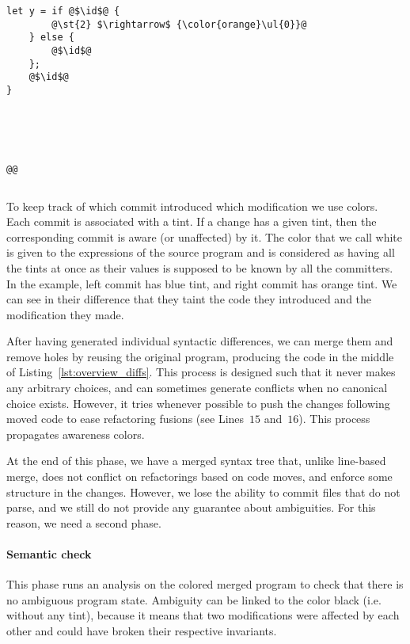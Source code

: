 \documentclass[a4paper,11pt]{article}
\newcommand\id{\square}
\begin{document}
\begin{minipage}{\textwidth}
\begin{minipage}{.32\textwidth}
\begin{lstlisting}[rulecolor=\color{orange!30}]
    let y = if @$\id$@ {
        @\st{2} $\rightarrow$ {\color{orange}\ul{0}}@
    } else {
        @$\id$@
    };
    @$\id$@
}





@@
\end{lstlisting}
\end{minipage}\hfill
\vspace{-.4cm}
\begin{lstlisting}[label=lst:overview_diffs, caption={Left (resp. right) represent the difference between original source code and blue commit (resp. orange commit). Center is the syntactic fusion of these two differences.}]
\end{lstlisting}
\end{minipage}

To keep track of which commit introduced which modification we use
colors. Each commit is associated with a tint. If a change has a given
tint, then the corresponding commit is aware (or unaffected) by
it. The color that we call white is given to the expressions of the
source program and is considered as having all the tints at once as
their values is supposed to be known by all the committers. In the
example, left commit has blue tint, and right commit has orange
tint. We can see in their difference that they taint the code they
introduced and the modification they made.

After having generated individual syntactic differences, we can merge
them and remove holes by reusing the original program, producing the
code in the middle of Listing~\ref{lst:overview_diffs}. This process is designed such that it never
makes any arbitrary choices, and can sometimes generate conflicts when
no canonical choice exists. However, it tries whenever possible to
push the changes following moved code to ease refactoring fusions (see Lines~$15$ and~$16$). This process propagates awareness colors.

At the end of this phase, we have a merged syntax tree that, unlike line-based merge, does not conflict on refactorings based on code moves, and enforce some structure in the changes. However, we lose the ability to commit files that do not parse, and we still do not provide any guarantee about ambiguities. For this reason, we need a second phase.

\paragraph{Semantic check}
This phase runs an analysis on the colored merged program to check that there is no ambiguous program state. Ambiguity can be linked to the color black (i.e. without any tint), because it means that two modifications were affected by each other and could have broken their respective invariants.
\end{document}
